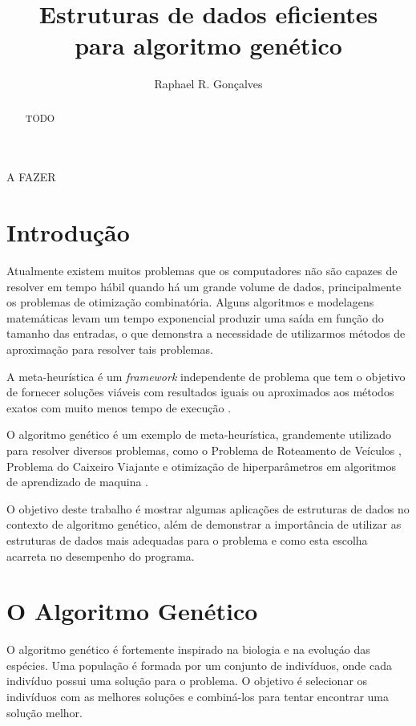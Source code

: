 \documentclass[12pt]{article}
\title{Estruturas de dados eficientes\\ para algoritmo gen\'{e}tico}
\author{Raphael R. Gon\c{c}alves\inst{1}}
\begin{document}
 

\maketitle

\begin{abstract}
    TODO
\end{abstract}
     
\begin{resumo} 
    A FAZER
\end{resumo}


\section{Introdu\c{c}\~{a}o}

Atualmente existem muitos problemas que os computadores n\~{a}o s\~{a}o capazes de resolver em tempo
h\'{a}bil quando h\'{a} um grande volume de dados, principalmente os problemas de otimiza\c{c}\~{a}o
combinat\'{o}ria. Alguns algoritmos e modelagens matem\'{a}ticas levam um tempo exponencial produzir
uma sa\'{i}da em fun\c{c}\~{a}o do tamanho das entradas, o que demonstra a necessidade de utilizarmos
m\'{e}todos de aproxima\c{c}\~{a}o para resolver tais problemas.

A meta-heur\'{i}stica \'{e} um \textit{framework} independente de problema que tem o objetivo
de fornecer solu\c{c}\~{o}es vi\'{a}veis com resultados iguais ou aproximados aos m\'{e}todos
exatos com muito menos tempo de execu\c{c}\~{a}o \cite{book:metaheuristics}.

O algoritmo gen\'{e}tico \'{e} um exemplo de meta-heur\'{i}stica, grandemente utilizado para
resolver diversos problemas, como o Problema de Roteamento de Ve\'{i}culos \cite{berger:03}, Problema do Caixeiro
Viajante e otimiza\c{c}\~{a}o de hiperpar\^{a}metros em algoritmos de aprendizado de maquina \cite{misc:introGA}.

O objetivo deste trabalho \'{e} mostrar algumas aplica\c{c}\~{o}es de estruturas de dados no contexto de
algoritmo gen\'{e}tico, al\'{e}m de demonstrar a import\^{a}ncia de utilizar as estruturas de dados
mais adequadas para o problema e como esta escolha acarreta no desempenho do programa.

\section{O Algoritmo Gen\'{e}tico}

O algoritmo gen\'{e}tico \'{e} fortemente inspirado na biologia e na evolu\c{c}\'{a}o das esp\'{e}cies.
Uma popula\c{c}\~{a}o \'{e} formada por um conjunto de indiv\'{i}duos, onde cada indiv\'{i}duo possui uma
solu\c{c}\~{a}o para o problema. O objetivo \'{e} selecionar os indiv\'{i}duos com as melhores
solu\c{c}\~{o}es e combin\'{a}-los para tentar encontrar uma solu\c{c}\~{a}o melhor.
\end{document}
